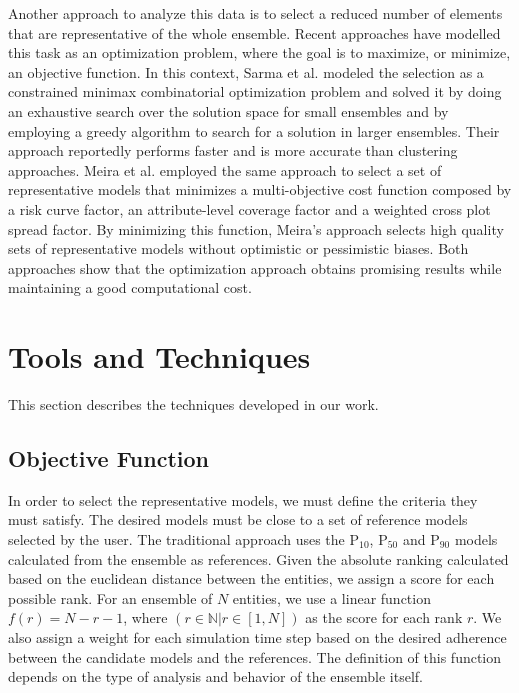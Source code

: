 \documentclass{sigchi-ext}
\begin{document}
Another approach to analyze this data is to select a reduced number of elements that are representative of the whole ensemble. Recent approaches have modelled this task as an optimization problem, where the goal is to maximize, or minimize, an objective function. In this context, Sarma et al. \cite{selection-sarma:2013} modeled the selection as a constrained minimax combinatorial optimization problem and solved it by doing an exhaustive search over the solution space for small ensembles and by employing a greedy algorithm to search for a solution in larger ensembles. Their approach reportedly performs faster and is more accurate than clustering approaches. Meira et al. \cite{meira:2016} employed the same approach to select a set of representative models that minimizes a multi-objective cost function composed by a risk curve factor, an attribute-level coverage factor and a weighted cross plot spread factor. By minimizing this function, Meira's approach selects high quality sets of representative models without optimistic or pessimistic biases. Both approaches show that the optimization approach obtains promising results while maintaining a good computational cost.

\section{Tools and Techniques}
\label{sec:tools}
This section describes the techniques developed in our work.

\subsection{Objective Function}
\label{sec:obj_func}
In order to select the representative models, we must define the criteria they must satisfy. The desired models must be close to a set of reference models selected by the user. The traditional approach uses the P$_{10}$, P$_{50}$ and P$_{90}$ models calculated from the ensemble as references. Given the absolute ranking calculated based on the euclidean distance between the entities, we assign a score for each possible rank. For an ensemble of $N$ entities, we use a linear function $f(r) = N - r - 1$, where $\left(r \in \mathbb{N} | r \in [1, N] \right)$ as the score for each rank $r$. We also assign a weight for each simulation time step based on the desired adherence between the candidate models and the references. The definition of this function depends on the type of analysis and behavior of the ensemble itself.
\end{document}
